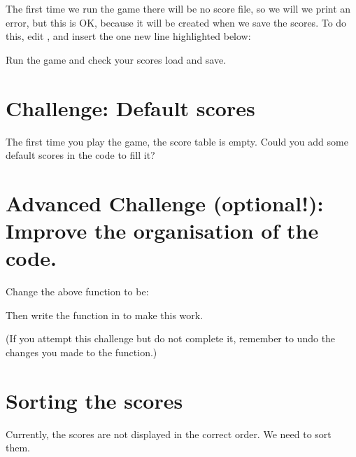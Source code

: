 \documentclass[letterpaper,10pt,english]{sphinxmanual}
\begin{document}
\sphinxAtStartPar
The first time we run the game there will be no score file, so we will we print an error, but this is OK, because
it will be created when we save the scores.  To do this, edit ,  and insert the
one new line highlighted below:

\sphinxAtStartPar
Run the game and check your scores load and save.


\section{Challenge: Default scores}
\label{\detokenize{pandoc_tut:challenge-default-scores}}
\sphinxAtStartPar
The first time you play the game, the score table is empty.  Could you add some default scores in the code
to fill it?


\section{Advanced Challenge (optional!):  Improve the organisation of the code.}
\label{\detokenize{pandoc_tut:advanced-challenge-optional-improve-the-organisation-of-the-code}}
\sphinxAtStartPar
Change the above function to be:

\begin{sphinxVerbatim}[commandchars=\\\{\}]
 
\end{sphinxVerbatim}

\sphinxAtStartPar
Then write the  function in  to make this work.

\sphinxAtStartPar
(If you attempt this challenge but do not complete it, remember to undo the changes you made to
the  function.)


\section{Sorting the scores}
\label{\detokenize{pandoc_tut:sorting-the-scores}}
\sphinxAtStartPar
Currently, the scores are not displayed in the correct order.  We need to sort them.
\end{document}
